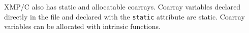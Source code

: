 XMP/C also has static and allocatable coarrays.
Coarray variables declared directly in the file and declared with 
the {\tt static} attribute are static.
Coarray variables can be allocated with intrinsic functions.







